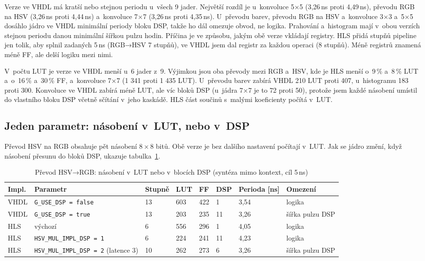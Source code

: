 

Verze ve VHDL má kratší nebo stejnou periodu u~všech 9 jader. Největší rozdíl je u~konvoluce 5×5 (3,26\,ns proti 4,49\,ns), převodu RGB na HSV (3,26\,ns proti 4,44\,ns) a~konvoluce 7×7 (3,26\,ns proti 4,35\,ns). U~převodu barev, převodu RGB na HSV a~konvoluce 3×3 a~5×5 dosáhlo jádro ve VHDL minimální periody bloku DSP, takže ho dál omezuje obvod, ne logika. Prahování a~histogram mají v~obou verzích stejnou periodu danou minimální šířkou pulzu hodin. Příčina je ve způsobu, jakým obě verze vkládají registry. HLS přidá stupňů pipeline jen tolik, aby splnil zadaných 5\,ns (RGB→HSV 7 stupňů), ve VHDL jsem dal registr za každou operaci (8 stupňů). Méně registrů znamená méně FF, ale delší logiku mezi nimi.

V~počtu \acs{LUT} je verze ve VHDL menší u~6 jader z~9. Výjimkou jsou oba převody mezi RGB a~HSV, kde je HLS menší o~9\,\% a~8\,\% LUT a~o~16\,\% a~30\,\% FF, a~konvoluce 7×7 (1 341 proti 1 435 LUT). U~převodu barev zabírá VHDL 210 LUT proti 407, u~histogramu 183 proti 300. Konvoluce ve VHDL zabírá méně LUT, ale víc bloků DSP (u~jádra 7×7 je to 72 proti 50), protože jsem každé násobení umístil do vlastního bloku DSP včetně sčítání v~jeho kaskádě. HLS část součinů s~malými koeficienty počítá v~LUT.

\subsection{Jeden parametr: násobení v~LUT, nebo v~DSP}

Převod HSV na RGB obsahuje pět násobení 8\,×\,8 bitů. Obě verze je bez dalšího nastavení počítají v~LUT. Jak se jádro změní, když násobení přesunu do bloků DSP, ukazuje tabulka~\ref{tab:hsvdsp}.


\begin{table}[htbp]
    \centering
    \caption{Převod HSV→RGB: násobení v~LUT nebo v~blocích DSP (syntéza mimo kontext, cíl 5\,ns)}
    \label{tab:hsvdsp}
    \begin{tabular}{p{1.3cm}p{4.0cm}p{1.4cm}p{1.1cm}p{1.1cm}p{1.0cm}p{1.4cm}p{2.8cm}}
        \toprule
        Impl. & Parametr & Stupně & LUT & FF & DSP & Perioda [ns] & Omezení \\
        \midrule
        VHDL & \texttt{G\_USE\_DSP = false} & 13 & 603 & 422 & 1 & 3,54 & logika \\
        VHDL & \texttt{G\_USE\_DSP = true} & 13 & 203 & 235 & 11 & 3,26 & šířka pulzu DSP \\
        HLS & výchozí & 6 & 556 & 296 & 1 & 4,05 & logika \\
        HLS & \texttt{HSV\_MUL\_IMPL\_DSP = 1} & 6 & 224 & 241 & 11 & 4,23 & logika \\
        HLS & \texttt{HSV\_MUL\_IMPL\_DSP = 2} (latence 3) & 10 & 262 & 273 & 6 & 3,26 & šířka pulzu DSP \\
        \bottomrule
    \end{tabular}
\end{table}

